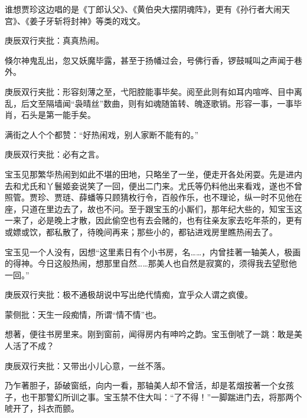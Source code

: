 \begin{parag}


    谁想贾珍这边唱的是《丁郎认父》、《黄伯央大摆阴魂阵》，更有《孙行者大闹天宫》、《姜子牙斩将封神》等类的戏文。\begin{note}庚辰双行夹批：真真热闹。\end{note}倏尔神鬼乱出，忽又妖魔毕露，甚至于扬幡过会，号佛行香，锣鼓喊叫之声闻于巷外。\begin{note}庚辰双行夹批：形容刻薄之至，弋阳腔能事毕矣。阅至此则有如耳内喧哗、目中离乱，后文至隔墙闻“袅晴丝”数曲，则有如魂随笛转、魄逐歌销。形容一事，一事毕肖，石头是第一能手矣。\end{note}满街之人个个都赞：“好热闹戏，别人家断不能有的。”\begin{note}庚辰双行夹批：必有之言。\end{note}宝玉见那繁华热闹到如此不堪的田地，只略坐了一坐，便走开各处闲耍。先是进内去和尤氏和丫鬟姬妾说笑了一回，便出二门来。尤氏等仍料他出来看戏，遂也不曾照管。贾珍、贾琏、薛蟠等只顾猜枚行令，百般作乐，也不理论，纵一时不见他在座，只道在里边去了，故也不问。至于跟宝玉的小厮们，那年纪大些的，知宝玉这一来了，必是晚上才散，因此偷空也有去会赌的，也有往亲友家去吃年茶的，更有或嫖或饮，都私散了，待晚间再来；那些小的，都钻进戏房里瞧热闹去了。
\end{parag}


\begin{parag}


    宝玉见一个人没有，因想“这里素日有个小书房，名……，内曾挂著一轴美人，极画的得神。今日这般热闹，想那里自然……那美人也自然是寂寞的，须得我去望慰他一回。”\begin{note}庚辰双行夹批：极不通极胡说中写出绝代情痴，宜乎众人谓之疯傻。\end{note}\begin{note}蒙侧批：天生一段痴情，所谓“情不情”也。\end{note}想著，便往书房里来。刚到窗前，闻得房内有呻吟之韵。宝玉倒唬了一跳：敢是美人活了不成？\begin{note}庚辰双行夹批：又带出小儿心意，一丝不落。\end{note}乃乍著胆子，舔破窗纸，向内一看，那轴美人却不曾活，却是茗烟按著一个女孩子，也干那警幻所训之事。宝玉禁不住大叫：“了不得！”一脚踹进门去，将那两个唬开了，抖衣而颤。
\end{parag}



